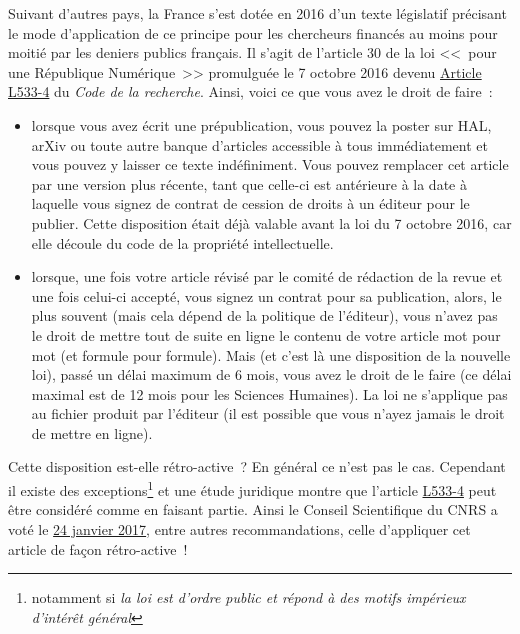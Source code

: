 Suivant d'autres pays, la France s'est dot{\'e}e en 2016 d'un texte l{\'e}gislatif pr{\'e}cisant le mode d'application de ce principe pour les chercheurs financ{\'e}s
au moins pour moiti{\'e} par les deniers publics fran{\c c}ais. Il s'agit de l'article 30 de la loi <<~pour une R{\'e}publique Num{\'e}rique~>> promulgu{\'e}e le 7 octobre 2016
devenu \href{https://www.legifrance.gouv.fr/affichCodeArticle.do;jsessionid=B2842ED6626DE6921F9FD32EA69A3C93.tpdila15v_2?idArticle=LEGIARTI000033205794&cidTexte=LEGITEXT000006071190&dateTexte=20170124}{Article L533-4}
du \emph{Code de la recherche}.
Ainsi, voici ce que vous avez le droit de faire~:
\begin{itemize}
\item lorsque vous avez {\'e}crit une pr{\'e}publication, vous pouvez la poster sur HAL, arXiv ou toute autre banque d'articles accessible {\`a} tous imm{\'e}diatement
et vous pouvez y laisser ce texte ind{\'e}finiment. Vous pouvez remplacer cet article par une version plus r{\'e}cente, tant que celle-ci est ant{\'e}rieure {\`a} la date
{\`a} laquelle vous signez de contrat de cession de droits {\`a} un {\'e}diteur pour le publier. Cette disposition {\'e}tait d{\'e}j{\`a} valable avant la loi du 7 octobre 2016,
car elle d{\'e}coule du code de la propri{\'e}t{\'e} intellectuelle.
\item lorsque, une fois votre article r{\'e}vis{\'e} par le comit{\'e} de r{\'e}daction de la revue et une fois celui-ci accept{\'e}, vous signez un contrat pour sa publication,
alors, le plus souvent (mais cela d{\'e}pend de la politique de l'{\'e}diteur), vous n'avez pas le droit de mettre tout de suite en ligne le contenu de votre article
mot pour mot (et formule pour formule). Mais (et c'est l{\`a} une disposition de la nouvelle loi), pass{\'e} un d{\'e}lai maximum de 6 mois, vous avez le droit de le faire
(ce d{\'e}lai maximal est de 12 mois pour les Sciences Humaines). La loi ne s'applique pas  au fichier produit par l'{\'e}diteur (il est possible que vous n'ayez
jamais le droit de mettre en ligne).
\end{itemize}
\medskip
\noindent
Cette disposition est-elle r{\'e}tro-active~? 
En g{\'e}n{\'e}ral ce n'est pas le cas. Cependant il existe des exceptions\footnote{notamment si
\emph{la loi est d'ordre public et r{\'e}pond {\`a} des motifs imp{\'e}rieux d'int{\'e}r{\^e}t g{\'e}n{\'e}ral}}
et une {\'e}tude juridique montre que l'article
\href{https://www.legifrance.gouv.fr/affichCodeArticle.do;jsessionid=B2842ED6626DE6921F9FD32EA69A3C93.tpdila15v_2?idArticle=LEGIARTI000033205794&cidTexte=LEGITEXT000006071190&dateTexte=20170124}{L533-4}
peut {\^e}tre consid{\'e}r{\'e} comme en faisant partie. Ainsi
le Conseil Scientifique du CNRS a vot{\'e} le \href{http://www.cnrs.fr/comitenational/doc/recommandations/2017/Reco_Interpetation_de_la_loi_numerique.pdf}{24 janvier 2017}, entre autres
recommandations, celle d'appliquer cet article 
de fa{\c c}on r{\'e}tro-active~!


